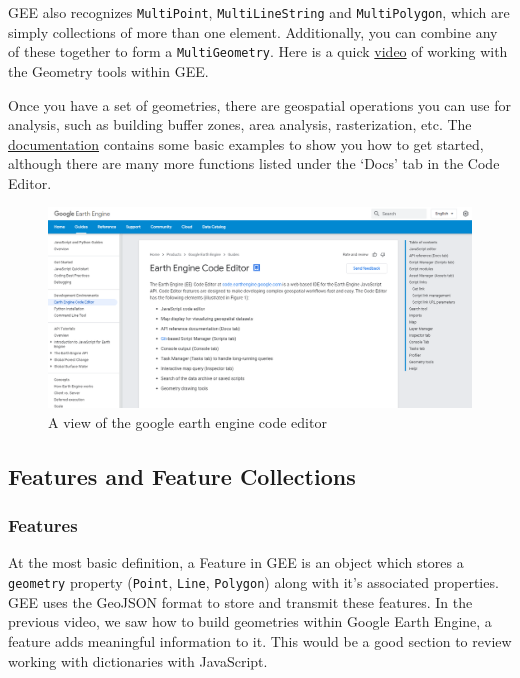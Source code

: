 \documentclass[
]{article}
\begin{document}
GEE also recognizes \texttt{MultiPoint}, \texttt{MultiLineString} and \texttt{MultiPolygon}, which are simply collections of more than one element. Additionally, you can combine any of these together to form a \texttt{MultiGeometry}. Here is a quick \href{https://www.youtube.com/watch?v=OdBhndxgN48}{video} of working with the Geometry tools within GEE.

Once you have a set of geometries, there are geospatial operations you can use for analysis, such as building buffer zones, area analysis, rasterization, etc. The \href{https://developers.google.com/earth-engine/guides/geometric_operations}{documentation} contains some basic examples to show you how to get started, although there are many more functions listed under the `Docs' tab in the Code Editor.

\begin{figure}
\includegraphics[width=0.8\linewidth]{./im/im_01_01} \caption{A view of the google earth engine code editor}\label{fig:code-editor}
\end{figure}

\hypertarget{features-and-feature-collections}{%
\subsection{Features and Feature Collections}\label{features-and-feature-collections}}

\hypertarget{features}{%
\subsubsection{Features}\label{features}}

At the most basic definition, a Feature in GEE is an object which stores a \texttt{geometry} property (\texttt{Point}, \texttt{Line}, \texttt{Polygon}) along with it's associated properties. GEE uses the GeoJSON format to store and transmit these features. In the previous video, we saw how to build geometries within Google Earth Engine, a feature adds meaningful information to it. This would be a good section to review working with dictionaries with JavaScript.
\end{document}
